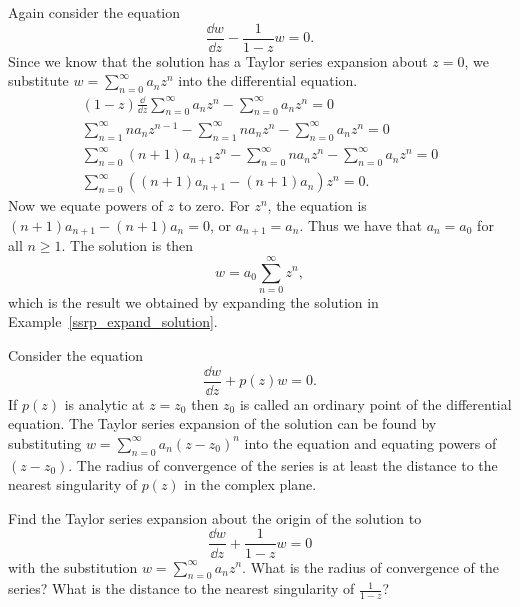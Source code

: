 \begin{Example}
  Again consider the equation
  \[ 
  \frac{\dd w}{\dd z} - \frac{1}{1-z} w = 0.
  \]
  Since we know that the solution has a Taylor series expansion about $z=0$,
  we substitute $w = \sum_{n=0}^\infty a_n z^n$ into the differential equation.
  \begin{gather*}
    (1-z) \frac{\dd}{\dd z} \sum_{n=0}^\infty a_n z^n 
    - \sum_{n=0}^\infty a_n z^n = 0 \\
    \sum_{n=1}^\infty n a_n z^{n-1} - \sum_{n=1}^\infty n a_n z^n 
    - \sum_{n=0}^\infty a_n z^n = 0 \\
    \sum_{n=0}^\infty (n+1) a_{n+1} z^n - \sum_{n=0}^\infty n a_n z^n 
    - \sum_{n=0}^\infty a_n z^n = 0 \\
    \sum_{n=0}^\infty \left((n+1) a_{n+1} - (n+1) a_n \right) z^n = 0.
  \end{gather*}
  Now we equate powers of $z$ to zero.  For $z^n$, the equation is 
  $(n+1) a_{n+1} - (n+1) a_n = 0$, or $a_{n+1} = a_n$.  Thus we have that
  $a_n = a_0$ for all $n \geq 1$.  The solution is then
  \[ 
  \boxed{ 
    w = a_0 \sum_{n=0}^\infty z^n, 
    } 
  \]
  which is the result we obtained by expanding the solution in 
  Example~\ref{ssrp_expand_solution}.
\end{Example}




\begin{Result}
  Consider the equation
  \[ 
  \frac{\dd w}{\dd z} + p(z) w = 0. 
  \]
  If $p(z)$ is analytic at $z = z_0$ then $z_0$ is called an ordinary point
  of the differential equation.  The Taylor series expansion of the solution
  can be found by substituting $w = \sum_{n=0}^\infty a_n (z-z_0)^n$ into the 
  equation and equating powers of $(z-z_0)$.  The radius of convergence of the
  series is at least the distance to the nearest singularity of $p(z)$ in 
  the complex plane.
\end{Result}






\begin{Exercise} 
  \label{exercise dwdz + 1 1-z w}
  Find the Taylor series expansion about the origin of the solution to
  \[
  \frac{\dd w}{\dd z} + \frac{1}{1-z} w = 0
  \]
  with the substitution $w = \sum_{n=0}^\infty a_n z^n$.  What is the 
  radius of convergence of the series?  What is the distance to the nearest
  singularity of $\frac{1}{1-z}$?

\end{Exercise}











